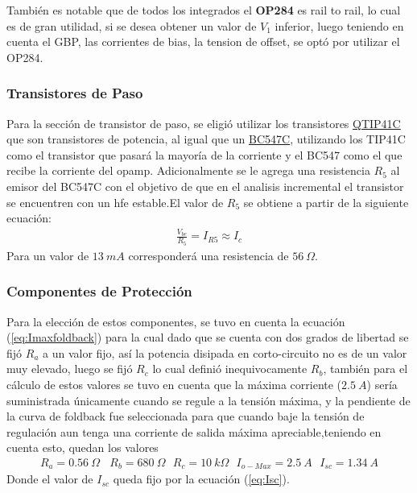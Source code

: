 También es notable que de todos los integrados el \textbf{OP284} es rail to rail, lo cual es de gran utilidad, si se desea obtener un valor de $V_1$ inferior, luego teniendo en cuenta el GBP, las corrientes de bias, la tension de offset, se optó por utilizar el OP284.
\subsubsection{Transistores de Paso}
Para la sección de transistor de paso, se eligió utilizar los transistores \href{https://pdf1.alldatasheet.com/datasheet-pdf/view/532914/FAIRCHILD/TIP31C.html}{QTIP41C} que son transistores de potencia, al igual que un \href{https://pdf1.alldatasheet.com/datasheet-pdf/view/2895/MOTOROLA/BC547C.html}{BC547C}, utilizando los TIP41C como el transistor que pasará la mayoría de la corriente y el BC547 como el que recibe la corriente del opamp.
Adicionalmente se le agrega una resistencia $R_5$ al emisor del BC547C con el objetivo de que en el analisis incremental el transistor se encuentren con un hfe estable.El valor de $R_5$ se obtiene a partir de la siguiente ecuación:
\begin{align}
\frac{V_{be}}{R_5}=I_{R5}\approx I_c
\end{align}
Para un valor de $13 \ mA$ corresponderá una resistencia de $56 \ \Omega$.
\subsubsection{Componentes de Protección}

Para la elección de estos componentes, se tuvo en cuenta la ecuación (\ref{eq:Imaxfoldback}) para la cual dado que se cuenta con dos grados de libertad se fijó $R_a$ a un valor fijo, así la potencia disipada en corto-circuito no es de un valor muy elevado, luego se fijó  $R_c$ lo cual definió inequivocamente $R_b$, también para el cálculo de estos valores se tuvo en cuenta que la máxima corriente ($2.5 \ A$) sería suministrada únicamente cuando se regule a la tensión máxima, y la pendiente de la curva de foldback fue seleccionada para que cuando baje la tensión de regulación aun tenga una corriente de salida máxima apreciable,teniendo en cuenta esto, quedan los valores
\begin{align}
R_a=0.56 \ \Omega  \ \ \ \ R_b=680 \ \Omega \ \ \ R_c=10 \ k\Omega \ \ \ I_{o-Max}=2.5 \ A \ \ \ I_{sc}= 1.34 \ A
\end{align}
Donde el valor de $I_{sc}$ queda fijo por la ecuación (\ref{eq:Isc}).

